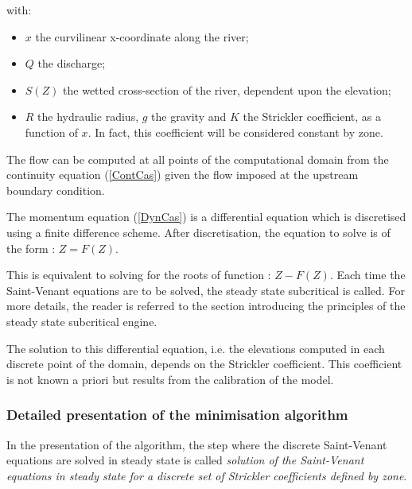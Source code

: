 with:
\begin{itemize}
  \item $x$ the curvilinear x-coordinate along the river;
  \item $Q$ the discharge;
  \item $S(Z)$ the wetted cross-section of the river, dependent upon the elevation;
  \item $R$ the hydraulic radius, $g$ the gravity and $K$ the Strickler coefficient, as a function of $x$. In fact, this coefficient will be considered constant by zone.
\end{itemize}

\vspace{0.5cm}

The flow can be computed at all points of the computational domain from the continuity equation (\ref{ContCas}) given the flow imposed at the upstream boundary condition. 

\vspace{0.5cm}

The momentum equation (\ref{DynCas}) is a differential equation which is discretised using a finite difference scheme. After discretisation, the equation to solve is of the form : $Z=F(Z)$.

\vspace{0.5cm}

This is equivalent to solving for the roots of function : $Z-F(Z)$. Each time the Saint-Venant equations are to be solved, the steady state subcritical is called. For more details, the reader is referred to the section introducing the principles of the steady state subcritical engine.

\vspace{0.5cm}

The solution to this differential equation, i.e. the elevations computed in each discrete point of the domain, depends on the Strickler coefficient. This coefficient is not known a priori but results from the calibration of the model.

\subsubsection{Detailed presentation of the minimisation algorithm}

In the presentation of the algorithm, the step where the discrete Saint-Venant equations are solved in steady state is called \textit{solution of the Saint-Venant equations in steady state for a discrete set of Strickler coefficients defined by zone}.

